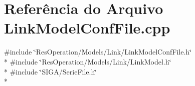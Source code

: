 \section{Referência do Arquivo Link\+Model\+Conf\+File.\+cpp}
\label{_link_model_conf_file_8cpp}
{\ttfamily \#include \char`\"{}Res\+Operation/\+Models/\+Link/\+Link\+Model\+Conf\+File.\+h\char`\"{}}\\*
{\ttfamily \#include \char`\"{}Res\+Operation/\+Models/\+Link/\+Link\+Model.\+h\char`\"{}}\\*
{\ttfamily \#include \char`\"{}S\+I\+G\+A/\+Serie\+File.\+h\char`\"{}}\\*

